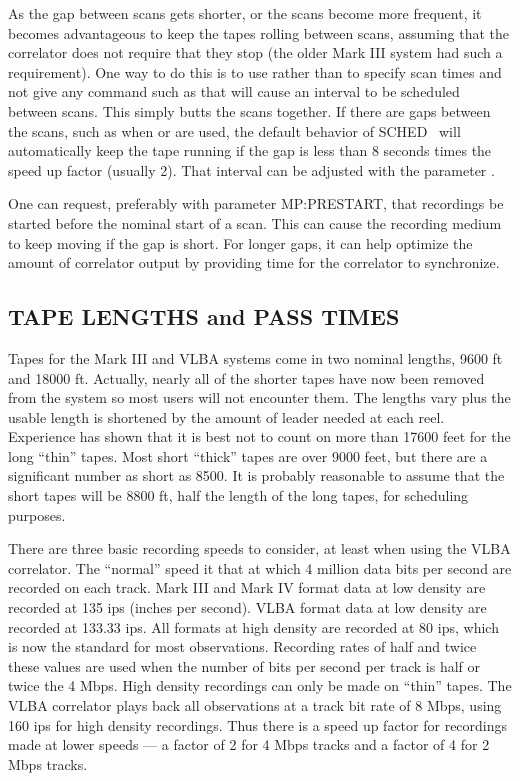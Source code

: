 \documentclass{report}
\newcommand{\schedb}{{\sc SCHED~}}
\begin{document}
As the gap between scans gets shorter, or the scans become more
frequent, it becomes advantageous to keep the tapes rolling between
scans, assuming that the correlator does not require that they stop
(the older Mark III system had such a requirement).  One way to do
this is to use  rather than  to specify scan times and not give any command such as
 that will cause an interval to be scheduled
between scans.  This simply butts the scans together.  If there are gaps
between the scans, such as when  or
 are used, the default behavior of \schedb
will automatically keep the tape running if the gap is less than
8 seconds times the speed up factor (usually 2).  That interval can
be adjusted with the parameter .

One can request, preferably with parameter 
{MP:PRESTART}, that recordings be started before the nominal start of
a scan.  This can cause the recording medium to keep moving if the gap
is short.  For longer gaps, it can help optimize the amount of
correlator output by providing time for the correlator to synchronize.


\subsection{\label{SSSEC:TAPELEN}TAPE LENGTHS and PASS TIMES}

Tapes for the Mark III and VLBA systems come in two nominal lengths,
9600 ft and 18000 ft.  Actually, nearly all of the shorter tapes have
now been removed from the system so most users will not encounter
them.  The lengths vary plus the usable length is shortened by the
amount of leader needed at each reel.  Experience has shown that it is
best not to count on more than 17600 feet for the long ``thin'' tapes.
Most short ``thick'' tapes are over 9000 feet, but there are a
significant number as short as 8500.  It is probably reasonable to
assume that the short tapes will be 8800 ft, half the length of the
long tapes, for scheduling purposes.

There are three basic recording speeds to consider, at least when
using the VLBA correlator.  The ``normal'' speed it that at which 4
million data bits per second are recorded on each track.  Mark III and
Mark IV format data at low density are recorded at 135 ips (inches per
second).  VLBA format data at low density are recorded at 133.33 ips.
All formats at high density are recorded at 80 ips, which is now the
standard for most observations.  Recording rates of half and twice
these values are used when the number of bits per second per track is
half or twice the 4 Mbps.  High density recordings can only be made on
``thin'' tapes.  The VLBA correlator plays back all observations at a
track bit rate of 8 Mbps, using 160 ips for high density recordings.
Thus there is a speed up factor for recordings made at lower speeds
--- a factor of 2 for 4 Mbps tracks and a factor of 4 for 2 Mbps
tracks.
\end{document}
